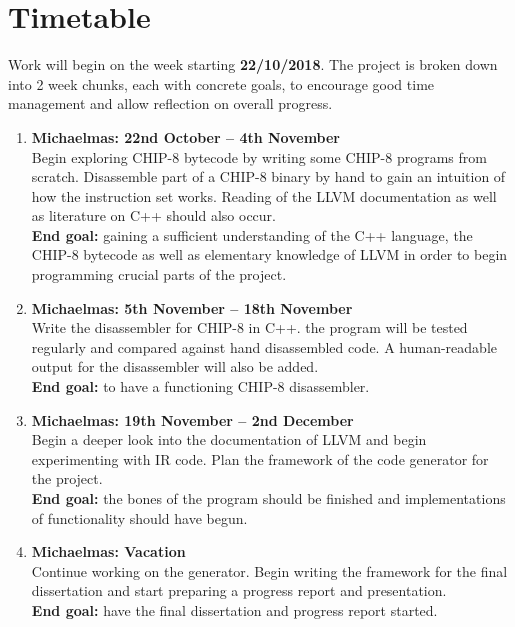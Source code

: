 \documentclass[12pt,a4paper,twoside]{article}
\begin{document}
\section*{Timetable}

Work will begin on the week starting \textbf{22/10/2018}. The project is broken down into 2 week chunks, each with concrete goals, to encourage good time management and allow reflection on overall progress.

\begin{enumerate}

\item \textbf{Michaelmas: 22nd October -- 4th November}\\
Begin exploring CHIP-8 bytecode by writing some CHIP-8 programs from scratch. Disassemble part of a CHIP-8 binary by hand to gain an intuition of how the instruction set works. Reading of the LLVM documentation as well as literature on C++ should also occur.\\
\textbf{End goal:} gaining a sufficient understanding of the C++ language, the CHIP-8 bytecode as well as elementary knowledge of LLVM in order to begin programming crucial parts of the project. 

\item \textbf{Michaelmas: 5th November -- 18th November}\\
Write the disassembler for CHIP-8 in C++. the program will be tested regularly and compared against hand disassembled code. A human-readable output for the disassembler will also be added.\\
\textbf{End goal:} to have a functioning CHIP-8 disassembler.

\item \textbf{Michaelmas: 19th November -- 2nd December}\\
Begin a deeper look into the documentation of LLVM and begin experimenting with IR code. Plan the framework of the code generator for the project.\\
\textbf{End goal:} the bones of the program should be finished and implementations of functionality should have begun.

\item \textbf{Michaelmas: Vacation}\\
Continue working on the generator. Begin writing the framework for the final\\ dissertation and start preparing a progress report and presentation.\\
\textbf{End goal:} have the final dissertation and progress report started.


\end{enumerate}
\end{document}
